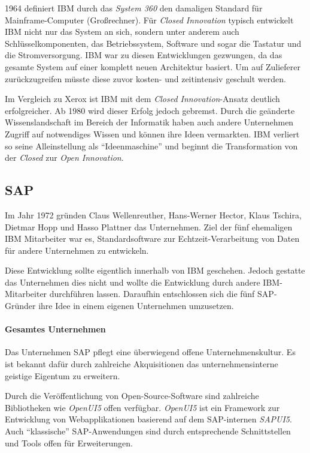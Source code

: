 1964 definiert IBM durch das \textit{System 360} den damaligen Standard für Mainframe-Computer (Großrechner).
Für \textit{Closed Innovation} typisch entwickelt IBM nicht nur das System an sich,
sondern unter anderem auch Schlüsselkomponenten, das Betriebssystem, Software und sogar die Tastatur und die Stromversorgung.
IBM war zu diesen Entwicklungen gezwungen,
da das gesamte System auf einer komplett neuen Architektur basiert.
Um auf Zulieferer zurückzugreifen müsste diese zuvor kosten- und zeitintensiv geschult werden.

Im Vergleich zu Xerox ist IBM mit dem \textit{Closed Innovation}-Ansatz deutlich erfolgreicher.
Ab 1980 wird dieser Erfolg jedoch gebremst.
Durch die geänderte Wissenslandschaft im Bereich der Informatik haben auch andere Unternehmen
Zugriff auf notwendiges Wissen und können ihre Ideen vermarkten.
IBM verliert so seine Alleinstellung als \enquote{Ideenmaschine}
und beginnt die Transformation von der \textit{Closed} zur \textit{Open Innovation}.


\subsection{SAP}\label{sec:beispiele-sap}
Im Jahr 1972 gründen Claus Wellenreuther, Hans-Werner Hector, Klaus Tschira, Dietmar Hopp und Hasso Plattner das Unternehmen.
Ziel der fünf ehemaligen IBM Mitarbeiter war es,
Standardsoftware zur Echtzeit-\linebreak{}Verarbeitung von Daten für andere Unternehmen zu entwickeln.

Diese Entwicklung sollte eigentlich innerhalb von IBM geschehen.
Jedoch gestatte das Unternehmen dies nicht und wollte die Entwicklung durch andere IBM-Mitarbeiter durchführen lassen.
Daraufhin entschlossen sich die fünf SAP-Gründer ihre Idee in einem eigenen Unternehmen umzusetzen. \cite{SAPCompa72:online}

\paragraph{Gesamtes Unternehmen}\label{sec:beispiele-sap-gesamt}
Das Unternehmen SAP pflegt eine überwiegend offene Unternehmenskultur.
Es ist bekannt dafür durch zahlreiche Akquisitionen das unternehmensinterne geistige Eigentum zu erweitern.

Durch die Veröffentlichung von Open-Source-Software sind zahlreiche Bibliotheken wie \textit{OpenUI5} offen verfügbar.
\textit{OpenUI5} ist ein Framework zur Entwicklung von Webapplikationen basierend auf dem SAP-internen \textit{SAPUI5}.
Auch \enquote{klassische} SAP-Anwendungen sind durch entsprechende Schnittstellen
und Tools offen für Erweiterungen.


